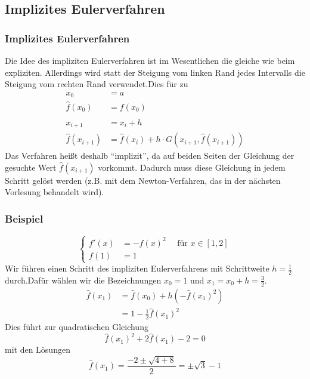 \subsection{Implizites Eulerverfahren}
\begin{frame}\frametitle{Implizites Eulerverfahren}
Die Idee des impliziten Eulerverfahren ist im Wesentlichen die gleiche wie beim expliziten. Allerdings wird statt der Steigung vom linken Rand jedes Intervalls die Steigung vom rechten Rand verwendet.\pause Dies für zu 
\begin{align*}
x_0&=a\\
\hat f(x_0)&=f(x_0)\\
&\\
x_{i+1}&=x_i+h\\
\hat f(x_{i+1})&=\hat f(x_i)+h\cdot G(x_{i+1},\hat f(x_{i+1}))
\end{align*}
\pause
Das Verfahren heißt deshalb ``implizit'', da auf beiden Seiten der Gleichung der gesuchte Wert $\hat f(x_{i+1})$ vorkommt. Dadurch muss diese Gleichung in jedem Schritt gelöst werden (z.B. mit dem Newton-Verfahren, das in der nächsten Vorlesung behandelt wird).
\end{frame}
%
\begin{frame}\frametitle{Beispiel}
$$
\begin{cases}
f'(x)&=-f(x)^2 \quad \text{ für } x \in [1,2]\\
f(1)&=1
\end{cases}
$$
\vfill
Wir führen einen Schritt des impliziten Eulerverfahrens mit Schrittweite $h=\frac{1}{2}$ durch.\pause Dafür wählen wir die Bezeichnungen $x_0=1$ und $x_1=x_0+h=\frac{3}{2}$.
\begin{align*}
\hat f(x_1)&=\hat f(x_0)+h(- \hat f(x_1)^2)\\
&=1-\frac{1}{2} \hat f(x_1)^2
\end{align*}
Dies führt zur quadratischen Gleichung
$$
\hat f(x_1)^2 + 2\hat f(x_1) -2=0
$$
mit den Lösungen 
$$
\hat f(x_1) = \frac{-2\pm \sqrt{4+8}}{2}= \pm \sqrt{3} - 1
$$
\end{frame}
%
%
